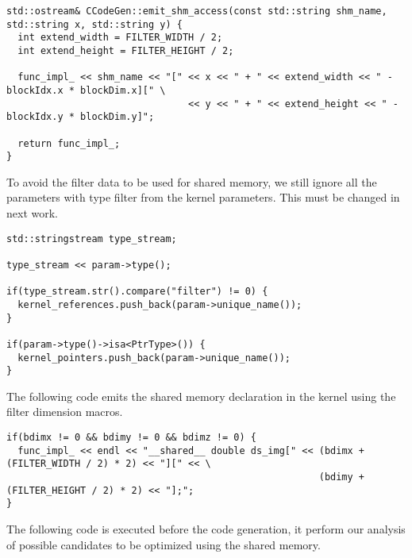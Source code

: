 \documentclass{article}
\begin{document}
\begin{verbatim}
std::ostream& CCodeGen::emit_shm_access(const std::string shm_name, std::string x, std::string y) {
  int extend_width = FILTER_WIDTH / 2;
  int extend_height = FILTER_HEIGHT / 2;

  func_impl_ << shm_name << "[" << x << " + " << extend_width << " - blockIdx.x * blockDim.x][" \
                                << y << " + " << extend_height << " - blockIdx.y * blockDim.y]";

  return func_impl_;
}
\end{verbatim}

To avoid the filter data to be used for shared memory, we still ignore all the parameters with type filter from the kernel parameters. This must be changed in next work.

\begin{verbatim}
std::stringstream type_stream;

type_stream << param->type();

if(type_stream.str().compare("filter") != 0) {
  kernel_references.push_back(param->unique_name());
}

if(param->type()->isa<PtrType>()) {
  kernel_pointers.push_back(param->unique_name());
}
\end{verbatim}

The following code emits the shared memory declaration in the kernel using the filter dimension macros.

\begin{verbatim}
if(bdimx != 0 && bdimy != 0 && bdimz != 0) {
  func_impl_ << endl << "__shared__ double ds_img[" << (bdimx + (FILTER_WIDTH / 2) * 2) << "][" << \
                                                       (bdimy + (FILTER_HEIGHT / 2) * 2) << "];";
}
\end{verbatim}

The following code is executed before the code generation, it perform our analysis of possible candidates to be optimized using the shared memory.
\end{document}
